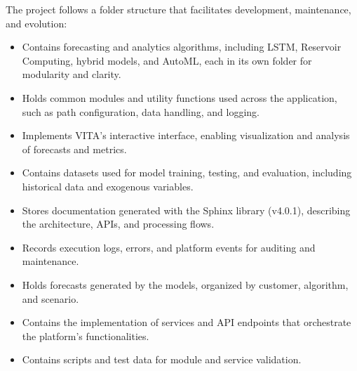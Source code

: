 \documentclass[letterpaper,10pt,english]{sphinxmanual}
\begin{document}
\sphinxAtStartPar
The project follows a folder structure that facilitates development, maintenance, and evolution:
\begin{itemize}
\item {} 
\sphinxAtStartPar
{} \textendash{} Contains forecasting and analytics algorithms, including LSTM, Reservoir Computing, hybrid models, and AutoML, each in its own folder for modularity and clarity.

\item {} 
\sphinxAtStartPar
{} \textendash{} Holds common modules and utility functions used across the application, such as path configuration, data handling, and logging.

\item {} 
\sphinxAtStartPar
{} \textendash{} Implements VITA’s interactive interface, enabling visualization and analysis of forecasts and metrics.

\item {} 
\sphinxAtStartPar
{} \textendash{} Contains datasets used for model training, testing, and evaluation, including historical data and exogenous variables.

\item {} 
\sphinxAtStartPar
{} \textendash{} Stores documentation generated with the Sphinx library (v4.0.1), describing the architecture, APIs, and processing flows.

\item {} 
\sphinxAtStartPar
{} \textendash{} Records execution logs, errors, and platform events for auditing and maintenance.

\item {} 
\sphinxAtStartPar
{} \textendash{} Holds forecasts generated by the models, organized by customer, algorithm, and scenario.

\item {} 
\sphinxAtStartPar
{} \textendash{} Contains the implementation of services and API endpoints that orchestrate the platform’s functionalities.

\item {} 
\sphinxAtStartPar
{} \textendash{} Contains scripts and test data for module and service validation.

\end{itemize}
\end{document}
